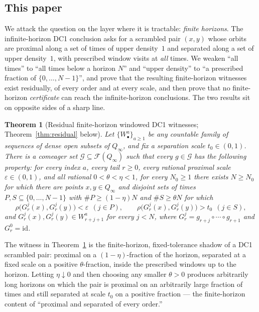\documentclass[11pt]{article}
\newtheorem{theorem}{Theorem}[section]
\newcommand{\Q}{Q_\infty}
\newcommand{\F}{\mathcal{F}}
\newcommand{\Gcal}{\mathcal{G}}
\begin{document}
\subsection*{This paper}

We attack the question on the layer where it is tractable: \emph{finite horizons}.  The
infinite-horizon DC1 conclusion asks for a scrambled pair $(x,y)$ whose orbits are
proximal along a set of times of upper density~$1$ and separated along a set of upper
density~$1$, with prescribed window visits at \emph{all} times.  We weaken ``all
times'' to ``all times below a horizon $N$'' and ``upper density'' to ``a prescribed
fraction of $\{0,\dots,N-1\}$'', and prove that the resulting finite-horizon witnesses
exist residually, of every order and at every scale, and then prove that no
finite-horizon \emph{certificate} can reach the infinite-horizon conclusions.  The two
results sit on opposite sides of a sharp line.

\begin{theorem}[Residual finite-horizon windowed DC1 witnesses;
Theorem~\ref{thm:residual} below]\label{thm:A}
Let $\{W^a_\bullet\}_{a\ge1}$ be any countable family of sequences of dense open subsets
of $\Q$, and fix a separation scale \(t_0\in(0,1)\).  There is a comeager set
$\Gcal\subseteq\F(\Q)$ such that every $g\in\Gcal$ has the following property: for every
index $a$, every tail $r\ge0$, every rational proximal scale $\varepsilon\in(0,1)$, and
all rational $0<\theta<\eta<1$, for every $N_0\ge1$ there exists $N\ge N_0$ for which
there are points $x,y\in\Q$ and disjoint sets of times
$P,S\subseteq\{0,\dots,N-1\}$ with $\#P\ge(1-\eta)N$ and $\#S\ge\theta N$ for which
\[
\rho\bigl(G^j_r(x),G^j_r(y)\bigr)<\varepsilon\ \ (j\in P),
\qquad
\rho\bigl(G^j_r(x),G^j_r(y)\bigr)>t_0\ \ (j\in S),
\]
and $G^j_r(x),G^j_r(y)\in W^a_{r+j+1}$ for every $j<N$, where
$G^j_r=g_{r+j}\circ\cdots\circ g_{r+1}$ and $G^0_r=\mathrm{id}$.
\end{theorem}

The witness in Theorem~\ref{thm:A} is the finite-horizon, fixed-tolerance shadow of a
DC1 scrambled pair: proximal on a $(1-\eta)$-fraction of the horizon, separated at a
fixed scale on a positive $\theta$-fraction, inside the prescribed windows up to the
horizon.  Letting $\eta\downarrow0$ and then choosing any smaller $\theta>0$ produces
arbitrarily long horizons on which the pair is proximal on an arbitrarily large fraction
of times and still separated at scale $t_0$ on a positive fraction --- the finite-horizon
content of ``proximal and separated of every order.''
\end{document}

